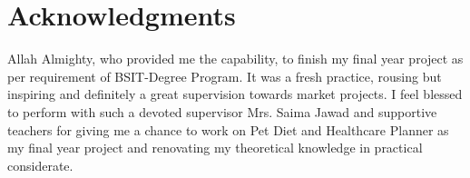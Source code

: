 \chapter*{Acknowledgments}

Allah Almighty, who provided me the capability, to finish my final year project as per requirement of BSIT-Degree Program. It was a fresh practice, rousing but inspiring and definitely a great supervision towards market projects. I feel blessed to perform with such a devoted supervisor Mrs. Saima Jawad and supportive teachers for giving me a chance to work on Pet Diet and Healthcare Planner as my final year project and renovating my theoretical knowledge in practical considerate.




\vspace{10mm}




